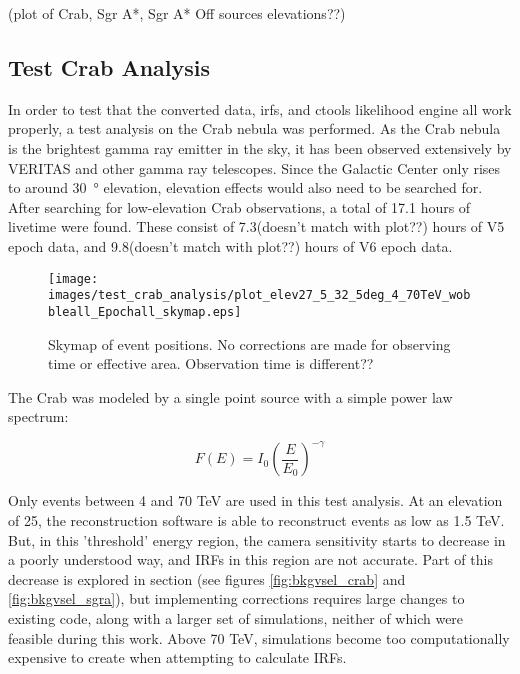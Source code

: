   (plot of Crab, Sgr A*, Sgr A* Off sources elevations??)

  \subsection{Test Crab Analysis}

    In order to test that the converted data, irfs, and ctools likelihood engine all work properly, a test analysis on the Crab nebula was performed.
    As the Crab nebula is the brightest gamma ray emitter in the sky, it has been observed extensively by VERITAS and other gamma ray telescopes.
    Since the Galactic Center only rises to around \SI{30}{\degree} elevation, elevation effects would also need to be searched for.
    After searching for low-elevation Crab observations, a total of 17.1 hours of livetime were found.
    These consist of 7.3(doesn't match with plot??) hours of V5 epoch data, and 9.8(doesn't match with plot??) hours of V6 epoch data.
    
    \begin{figure}[h]
      \centering
      \texttt{[image: images/test\_crab\_analysis/plot\_elev27\_5\_32\_5deg\_4\_70TeV\_wobbleall\_Epochall\_skymap.eps]}
      \caption[Crab Counts Skymap]
      {
        Skymap of event positions.
        No corrections are made for observing time or effective area.
        Observation time is different??
      }
      \label{fig:crab_skymap}
    \end{figure}
    
    The Crab was modeled by a single point source with a simple power law spectrum:

    \begin{equation} \label{eqn:powerlaw}
    F\left( E \right) = I_{0} \left( \frac{E}{E_{0}} \right)^{-\gamma}
    \end{equation}

    Only events between 4 and 70 TeV are used in this test analysis.
    At an elevation of 25\degree, the reconstruction software is able to reconstruct events as low as 1.5 TeV.
    But, in this 'threshold' energy region, the camera sensitivity starts to decrease in a poorly understood way, and IRFs in this region are not accurate.
    Part of this decrease is explored in section (see figures \ref{fig:bkgvsel_crab} and \ref{fig:bkgvsel_sgra}), but implementing corrections requires large changes to existing code, along with a larger set of simulations, neither of which were feasible during this work.
    Above 70 TeV, simulations become too computationally expensive to create when attempting to calculate IRFs.
    

